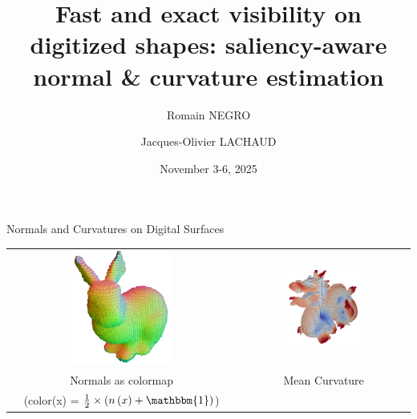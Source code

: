 \documentclass[11pt]{beamer}
\title[Visibility-based normals \& curvature]{Fast and exact visibility on digitized shapes: saliency-aware normal \& curvature estimation}
\author{Romain NEGRO \and Jacques-Olivier LACHAUD}
\institute{DGMM 2025}
\date{November 3-6, 2025}
\begin{document}
    \begin{frame}
        \titlepage
    \end{frame}

    \begin{frame}{Normals and Curvatures on Digital Surfaces}
        \centering
        \begin{tabular}{cc}
            \includegraphics[width=0.45\textwidth]{pictures/normal_digital_surf}
            &
            \includegraphics[width=0.45\textwidth]{pictures/Hcurv_digital_surface}
            \\
            Normals as colormap
            &
            Mean Curvature
            \\
            (color(x) = $\frac{1}{2} \times \left(n\left(x\right)+\mathbbm{1}\right)$)
        \end{tabular}
    \end{frame}
\end{document}
